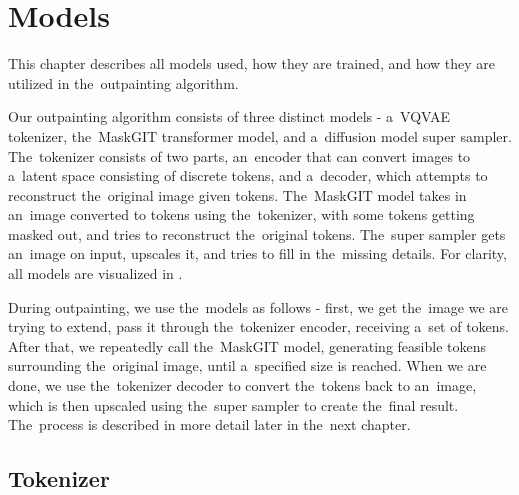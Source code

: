 \chapter{Models} \label{models}


This chapter describes all models used, how they are trained, and how they are utilized in the~outpainting algorithm.

Our outpainting algorithm consists of three distinct models - a~VQVAE tokenizer, the~MaskGIT transformer model, and a~diffusion model super sampler. The~tokenizer consists of two parts, an~encoder that can convert images to a~latent space consisting of discrete tokens, and a~decoder, which attempts to reconstruct the~original image given tokens. The~MaskGIT model takes in an~image converted to tokens using the~tokenizer, with some tokens getting masked out, and tries to reconstruct the~original tokens. The~super sampler gets an~image on input, upscales it, and tries to fill in the~missing details. For clarity, all models are visualized in .




During outpainting, we use the~models as follows - first, we get the~image we are trying to extend, pass it through the~tokenizer encoder, receiving a~set of tokens. After that, we repeatedly call the~MaskGIT model, generating feasible tokens surrounding the~original image, until a~specified size is reached. When we are done, we use the~tokenizer decoder to convert the~tokens back to an~image, which is then upscaled using the~super sampler to create the~final result. The~process is described in more detail later in the~next chapter.


\section{Tokenizer}

